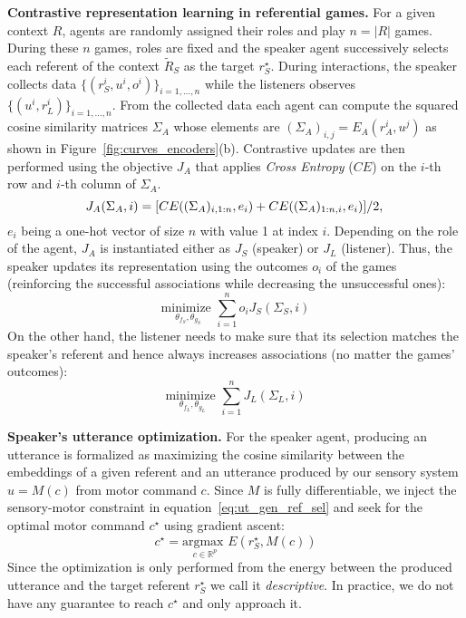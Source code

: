 \textbf{Contrastive representation learning in referential games. } 
For a given context $R$, agents are randomly assigned their roles and play $n=|R|$ games. During these $n$ games, roles are fixed and the speaker agent successively selects each referent of the context $\tilde{R}_S$ as the target $r^\star_S$. During interactions, the speaker collects data $\{(r_S^i, u^i, o^i)\}_{i=1,...,n}$ while the listeners observes $\{(u^i, r_L^i)\}_{i=1,...,n}$. From the collected data each agent can compute the squared cosine similarity matrices $\Sigma_A$ whose elements are $(\Sigma_A)_{i,j} = E_A(r_A^i, u^j)$ as shown in Figure~\ref{fig:curves_encoders}(b). Contrastive updates are then performed using the objective $J_A$ that applies \textit{Cross Entropy} ($CE$) on the $i$-th row and $i$-th column of $\Sigma_A$.
\begin{equation}
        J_A(\Sigma_A,i) = [CE((\Sigma_A)_{i,1:n},e_i) + CE((\Sigma_A)_{1:n,i},e_i)] / 2,\\    
\end{equation}
$e_i$ being a one-hot vector of size $n$ with value 1 at index $i$. Depending on the role of the agent, $J_A$ is instantiated either as $J_S$ (speaker) or $J_L$ (listener). Thus, the speaker updates its representation using the outcomes $o_i$ of the games (reinforcing the successful associations while decreasing the unsuccessful ones):
\begin{equation}
        \underset{\theta_{f_S}, \theta_{g_S}}{\textrm{minimize } } \overset{n}{\underset{i = 1}{\sum}} o_i  J_S(\Sigma_S,i)
\end{equation}
On the other hand, the listener needs to make sure that its selection matches the speaker's referent
\citep{steels2015talkingheads} and hence always increases associations (no matter the games' outcomes):
\begin{equation}
    \underset{\theta_{f_L}, \theta_{g_L}}{\textrm{minimize } } \overset{n}{\underset{i = 1}{\sum}} J_L(\Sigma_L,i)
\end{equation}

\textbf{Speaker's utterance optimization. } For the speaker agent, producing an utterance is formalized as maximizing the cosine similarity between the embeddings of a given referent and an utterance produced by our sensory system $u = M(c)$ from motor command $c$. Since $M$ is fully differentiable, we inject the sensory-motor constraint in equation~\ref{eq:ut_gen_ref_sel} and seek for the optimal motor command $c^\star$ using gradient ascent:
\begin{equation}
c^\star = \underset{c \in \mathbb{R}^p}{\textrm{argmax }} E(r^\star_S, M(c))
\label{eq:descri_gen}
\end{equation}
Since the optimization is only performed from the energy between the produced utterance and the target referent $r^\star_S$ we call it \textit{descriptive}. In practice, we do not have any guarantee to reach $c^\star$ and only approach it.

